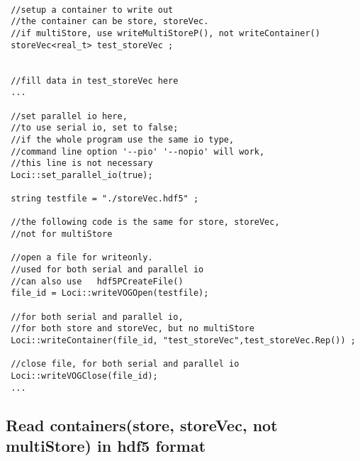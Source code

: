 \documentclass{article}
\begin{document}
\begin{lstlisting}

 //setup a container to write out 
 //the container can be store, storeVec.
 //if multiStore, use writeMultiStoreP(), not writeContainer() 
 storeVec<real_t> test_storeVec ;


 //fill data in test_storeVec here
 ...

 //set parallel io here,
 //to use serial io, set to false; 
 //if the whole program use the same io type, 
 //command line option '--pio' '--nopio' will work,
 //this line is not necessary  
 Loci::set_parallel_io(true);
 
 string testfile = "./storeVec.hdf5" ;

 //the following code is the same for store, storeVec,
 //not for multiStore

 //open a file for writeonly. 
 //used for both serial and parallel io
 //can also use   hdf5PCreateFile() 
 file_id = Loci::writeVOGOpen(testfile);

 //for both serial and parallel io, 
 //for both store and storeVec, but no multiStore
 Loci::writeContainer(file_id, "test_storeVec",test_storeVec.Rep()) ;

 //close file, for both serial and parallel io
 Loci::writeVOGClose(file_id);
 ...

\end{lstlisting}

\subsection {Read containers(store, storeVec, not multiStore) in hdf5 format }
\end{document}
